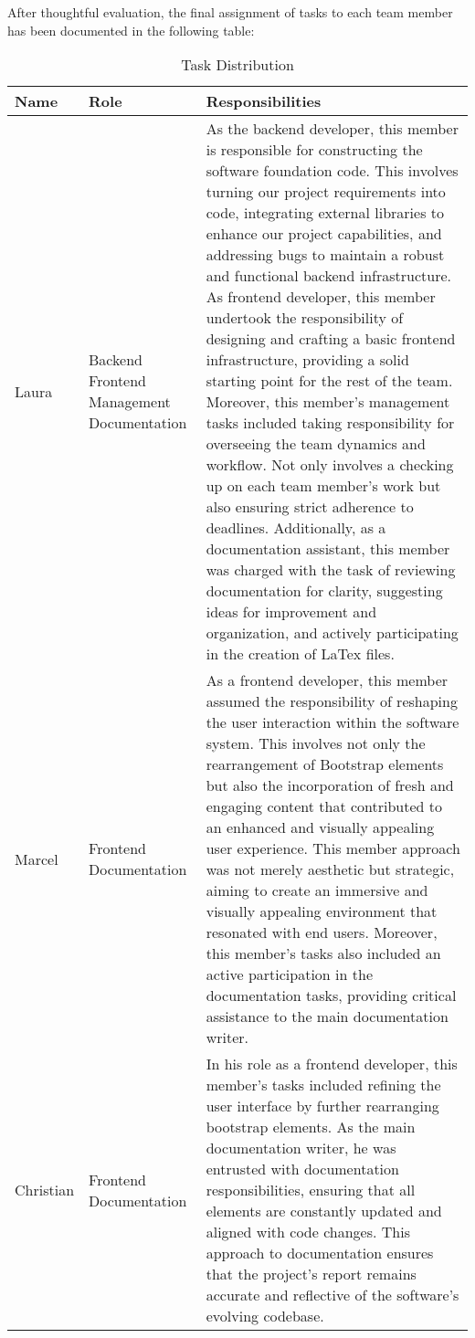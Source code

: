 \documentclass[conference]{IEEEtran}
\begin{document}
After thoughtful evaluation, the final assignment of tasks to each team member has been documented in the following table:
\begin{table}[H]
\centering
\begin{tabular}{| p{1cm}|p{1.5cm}|p{5cm} |}
\hline
\textbf{Name} & \textbf{Role} & \textbf{Responsibilities}\\
\hline
Laura & Backend Frontend Management Documentation & 
As the backend developer, this member is responsible for constructing the software foundation code. This involves turning our project requirements into code, integrating external libraries to enhance our project capabilities, and addressing bugs to maintain a robust and functional backend infrastructure.
As frontend developer, this member undertook the responsibility of designing and crafting a basic frontend infrastructure, providing a solid starting point for the rest of the team.
Moreover, this member’s management tasks included taking responsibility for overseeing the team dynamics and workflow. Not only involves a checking up on each team member’s work but also ensuring strict adherence to deadlines.
Additionally, as a documentation assistant, this member was charged with the task of reviewing documentation for clarity, suggesting ideas for improvement and organization, and actively participating in the creation of LaTex files.\\
\hline
Marcel & Frontend Documentation & 
As a frontend developer, this member assumed the responsibility of reshaping the user interaction within the software system. This involves not only the rearrangement of Bootstrap elements but also the incorporation of fresh and engaging content that contributed to an enhanced and visually appealing user experience. This member approach was not merely aesthetic but strategic, aiming to create an immersive and visually appealing environment that resonated with end users.
Moreover, this member’s tasks also included an active participation in the documentation tasks, providing critical assistance to the main documentation writer.\\
\hline
Christian & Frontend Documentation & 
In his role as a frontend developer, this member’s tasks included refining the user interface by further rearranging bootstrap elements.
As the main documentation writer, he was entrusted with documentation responsibilities, ensuring that all elements are constantly updated and aligned with code changes. This approach to documentation ensures that the project’s report remains accurate and reflective of the software’s evolving codebase.\\
\hline
\end{tabular}
\caption{Task Distribution}
\label{tab1}
\end{table}
\end{document}

